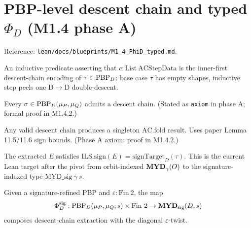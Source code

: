 \section{PBP-level descent chain and typed $\Phi_D$ (M1.4 phase A)}

Reference: \texttt{lean/docs/blueprints/M1\_4\_PhiD\_typed.md}.

\begin{definition}
  \label{def:IsDescentChain_D}
  \leanok
  An inductive predicate asserting that $c : \mathrm{List\ ACStepData}$ is the inner-first descent-chain encoding of $\tau \in \mathrm{PBP}_D$: base case $\tau$ has empty shapes, inductive step peels one D$\to$D double-descent.
\end{definition}

\begin{theorem}
  \label{thm:exists_descentChain_D}
  Every $\sigma \in \mathrm{PBP}_D(\mu_P, \mu_Q)$ admits a descent chain. (Stated as \texttt{axiom} in phase A; formal proof in M1.4.2.)
\end{theorem}

\begin{theorem}
  \label{thm:descentChain_D_singleton}
  Any valid descent chain produces a singleton $\mathrm{AC.fold}$ result. Uses paper Lemma 11.5/11.6 sign bounds. (Phase A axiom; proof in M1.4.2.)
\end{theorem}

\begin{theorem}
  \label{thm:descentChain_sign_match_D}
  \leanok
  The extracted $E$ satisfies
  $\mathrm{ILS.sign}(E)=\mathrm{signTarget}_D(\tau)$.
  This is the current Lean target after the pivot from orbit-indexed
  $\mathbf{MYD}_\gamma(O)$ to the signature-indexed type
  $\mathrm{MYD\_sig}\ \gamma\ s$.
\end{theorem}

\begin{definition}
  \label{def:Phi_D_typed}
  \leanok
  Given a signature-refined PBP and $\varepsilon : \mathrm{Fin}\ 2$, the
  map
  \[
    \Phi_D^{\mathrm{sig}} :
      \mathrm{PBP}_D(\mu_P,\mu_Q;s) \times \mathrm{Fin}\ 2
      \to \mathbf{MYD}_{\mathrm{sig}}(D,s)
  \]
  composes descent-chain extraction with the diagonal $\varepsilon$-twist.
\end{definition}


